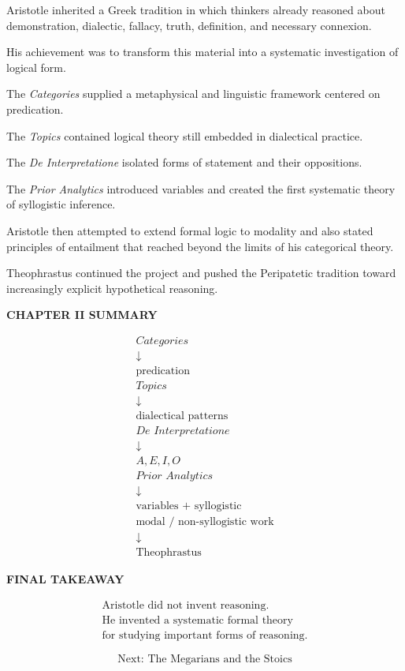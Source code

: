 \documentclass[11pt]{article}
\begin{document}
Aristotle inherited a Greek tradition in which thinkers already
reasoned about demonstration, dialectic, fallacy, truth,
definition, and necessary connexion.

His achievement was to transform this material into a
systematic investigation of logical form.

The \textit{Categories} supplied a metaphysical and linguistic
framework centered on predication.

The \textit{Topics} contained logical theory still embedded in
dialectical practice.

The \textit{De Interpretatione} isolated forms of statement and
their oppositions.

The \textit{Prior Analytics} introduced variables and created the
first systematic theory of syllogistic inference.

Aristotle then attempted to extend formal logic to modality and
also stated principles of entailment that reached beyond the
limits of his categorical theory.

Theophrastus continued the project and pushed the Peripatetic
tradition toward increasingly explicit hypothetical reasoning.

\begin{whiteboard}
\textbf{CHAPTER II SUMMARY}

\[
\begin{array}{c}
\textit{Categories}\\
\downarrow\\
\text{predication}
\\[0.7em]
\textit{Topics}\\
\downarrow\\
\text{dialectical patterns}
\\[0.7em]
\textit{De Interpretatione}\\
\downarrow\\
A,E,I,O
\\[0.7em]
\textit{Prior Analytics}\\
\downarrow\\
\text{variables + syllogistic}
\\[0.7em]
\text{modal / non-syllogistic work}\\
\downarrow\\
\text{Theophrastus}
\end{array}
\]
\end{whiteboard}

\begin{whiteboard}
\textbf{FINAL TAKEAWAY}

\[
\boxed{
\begin{array}{c}
\text{Aristotle did not invent reasoning.}\\[0.3em]
\text{He invented a systematic formal theory}\\
\text{for studying important forms of reasoning.}
\end{array}
}
\]

\vspace{0.8em}

\[
\text{Next: The Megarians and the Stoics}
\]
\end{whiteboard}
\end{document}
